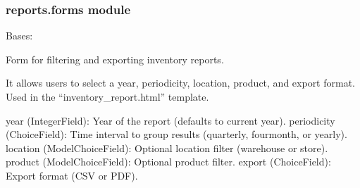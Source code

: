\documentclass[a4paper,11pt,spanish]{sphinxmanual}
\begin{document}
\subsubsection{reports.forms module}
\label{\detokenize{api/reports/reports.forms:module-reports.forms}}\label{\detokenize{api/reports/reports.forms:reports-forms-module}}\label{\detokenize{api/reports/reports.forms::doc}}

\begin{fulllineitems}
\label{\detokenize{api/reports/reports.forms:reports.forms.InventoryReportForm}}
\pysigstartsignatures
\pysiglinewithargsret
{}
{\sphinxparamcomma {}\sphinxparamcomma {}\sphinxparamcomma {}\sphinxparamcomma {}\sphinxparamcomma {}\sphinxparamcomma {}\sphinxparamcomma {}\sphinxparamcomma {}\sphinxparamcomma {}\sphinxparamcomma {}\sphinxparamcomma {}}
{}
\pysigstopsignatures
\sphinxAtStartPar
Bases: 

\sphinxAtStartPar
Form for filtering and exporting inventory reports.

\sphinxAtStartPar
It allows users to select a year, periodicity, location, product, and
export format. Used in the “inventory\_report.html” template.
\begin{description}
\sphinxAtStartPar
year (IntegerField): Year of the report (defaults to current year).
periodicity (ChoiceField): Time interval to group results (quarterly, four\sphinxhyphen{}month, or yearly).
location (ModelChoiceField): Optional location filter (warehouse or store).
product (ModelChoiceField): Optional product filter.
export (ChoiceField): Export format (CSV or PDF).


\end{description}
\end{fulllineitems}
\end{document}
